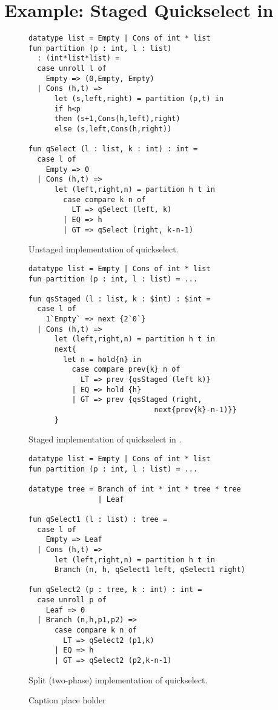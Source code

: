 \section {Example: Staged Quickselect in \lang}
\label{sec:staging}

\begin{figure*}
\label{fig:quickselect}
\begin{minipage}{0.5\textwidth}
\begin{lstlisting} 
datatype list = Empty | Cons of int * list
fun partition (p : int, l : list) 
  : (int*list*list) =
  case unroll l of 
    Empty => (0,Empty, Empty) 
  | Cons (h,t) =>
      let (s,left,right) = partition (p,t) in
      if h<p 
      then (s+1,Cons(h,left),right)
      else (s,left,Cons(h,right))

fun qSelect (l : list, k : int) : int = 
  case l of
    Empty => 0
  | Cons (h,t) => 
      let (left,right,n) = partition h t in
        case compare k n of
          LT => qSelect (left, k)
        | EQ => h
        | GT => qSelect (right, k-n-1)
\end{lstlisting}
\caption{Unstaged implementation of quickselect.}
\end{minipage}
\begin{minipage}{0.5\textwidth}
\begin{lstlisting} 
datatype list = Empty | Cons of int * list
fun partition (p : int, l : list) = ...

fun qsStaged (l : list, k : $int) : $int = 
  case l of
    1`Empty` => next {2`0`}
  | Cons (h,t) => 
      let (left,right,n) = partition h t in
      next{
        let n = hold{n} in
          case compare prev{k} n of
            LT => prev {qsStaged (left k)}
          | EQ => hold {h}
          | GT => prev {qsStaged (right, 
                             next{prev{k}-n-1)}}
      }	
\end{lstlisting}
\caption{Staged implementation of quickselect in \lang.}
\end{minipage}
\begin{minipage}{0.5\textwidth}
\begin{lstlisting}
datatype list = Empty | Cons of int * list
fun partition (p : int, l : list) = ...
	
datatype tree = Branch of int * int * tree * tree
                | Leaf

fun qSelect1 (l : list) : tree =
  case l of
    Empty => Leaf
  | Cons (h,t) => 
      let (left,right,n) = partition h t in
      Branch (n, h, qSelect1 left, qSelect1 right)

fun qSelect2 (p : tree, k : int) : int = 
  case unroll p of
    Leaf => 0
  | Branch (n,h,p1,p2) => 
      case compare k n of
        LT => qSelect2 (p1,k)
      | EQ => h
      | GT => qSelect2 (p2,k-n-1)
\end{lstlisting}
\caption{Split (two-phase) implementation of quickselect.}
\end{minipage}
\caption{Caption place holder}
\end{figure*}

